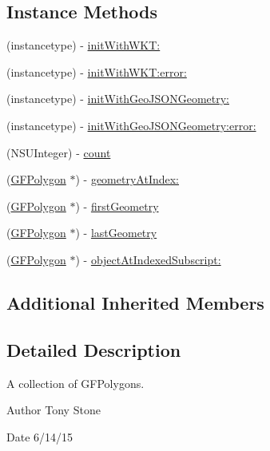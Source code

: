 \subsection*{Instance Methods}
\begin{DoxyCompactItemize}
\item 
(instancetype) -\/ \hyperlink{interface_g_f_multi_polygon_a321e0b2c64e6dbe079205f1c58a17a2f}{init\+With\+W\+K\+T\+:}
\item 
(instancetype) -\/ \hyperlink{interface_g_f_multi_polygon_a719e2a53a9fa5e29735d53f8fc9d9071}{init\+With\+W\+K\+T\+:error\+:}
\item 
(instancetype) -\/ \hyperlink{interface_g_f_multi_polygon_a2c8f29141e272aad174a9f65190d7cab}{init\+With\+Geo\+J\+S\+O\+N\+Geometry\+:}
\item 
(instancetype) -\/ \hyperlink{interface_g_f_multi_polygon_acc419d7ae28145fa7d47186b9d125e98}{init\+With\+Geo\+J\+S\+O\+N\+Geometry\+:error\+:}
\item 
(N\+S\+U\+Integer) -\/ \hyperlink{interface_g_f_multi_polygon_a268a15cb86f1a8a57bb9f7c7f07b6443}{count}
\item 
(\hyperlink{interface_g_f_polygon}{G\+F\+Polygon} $\ast$) -\/ \hyperlink{interface_g_f_multi_polygon_ab18a262a8d02f4b15250bad1d8073f2a}{geometry\+At\+Index\+:}
\item 
(\hyperlink{interface_g_f_polygon}{G\+F\+Polygon} $\ast$) -\/ \hyperlink{interface_g_f_multi_polygon_a7dca748ca40ba2e1de638d4aaf251144}{first\+Geometry}
\item 
(\hyperlink{interface_g_f_polygon}{G\+F\+Polygon} $\ast$) -\/ \hyperlink{interface_g_f_multi_polygon_a8aa2546c3a714b390a5d2580d1356b62}{last\+Geometry}
\item 
(\hyperlink{interface_g_f_polygon}{G\+F\+Polygon} $\ast$) -\/ \hyperlink{interface_g_f_multi_polygon_ac0de2e4160cbb5e83522fc72502f681c}{object\+At\+Indexed\+Subscript\+:}
\end{DoxyCompactItemize}
\subsection*{Additional Inherited Members}


\subsection{Detailed Description}
A collection of G\+F\+Polygons. 

\begin{DoxyAuthor}{Author}
Tony Stone 
\end{DoxyAuthor}
\begin{DoxyDate}{Date}
6/14/15 
\end{DoxyDate}


